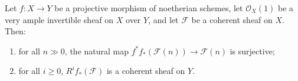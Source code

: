 Let $f: X \to Y$ be a projective morphism of noetherian schemes, let $\mathcal{O}_X(1)$ be a very ample invertible sheaf on $X$ over $Y$, and let $\mathcal{F}$ be a coherent sheaf on $X$. Then:
\begin{enumerate}
\item[(a)] for all $n \gg 0$, the natural map $f^* f_*(\mathcal{F}(n)) \to \mathcal{F}(n)$ is surjective;
\item[(b)] for all $i \geqslant 0$, $R^i f_*(\mathcal{F})$ is a coherent sheaf on $Y$.
\end{enumerate}
